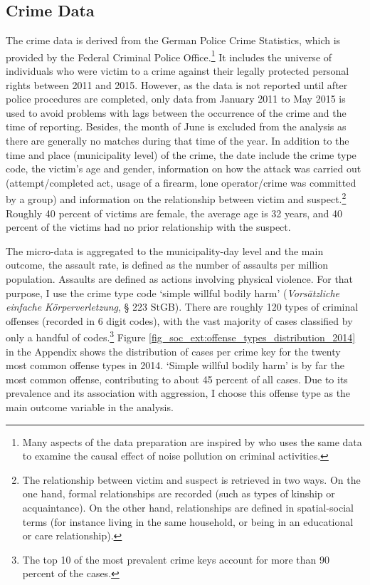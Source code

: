 \subsection{Crime Data}
The crime data is derived from the German Police Crime Statistics, which is provided by the Federal Criminal Police Office.\footnote{Many aspects of the data preparation are inspired by \cite{hener2019noise} who uses the same data to examine the causal effect of noise pollution on criminal activities.} It includes the universe of individuals who were victim to a crime against their legally protected personal rights between 2011 and 2015. However, as the data is not reported until after police procedures are completed, only data from January 2011 to May 2015 is used to avoid problems with lags between the occurrence of the crime and the time of reporting. Besides, the month of June is excluded from the analysis as there are generally no matches during that time of the year. In addition to the time and place (municipality level) of the crime, the date include the crime type code, the victim's age and gender, information on how the attack was carried out (attempt/completed act, usage of a firearm, lone operator/crime was committed by a group) and information on the relationship between victim and suspect.\footnote{The relationship between victim and suspect is retrieved in two ways. On the one hand, formal relationships are recorded (such as types of kinship or acquaintance). On the other hand, relationships are defined in spatial-social terms (for instance living in the same household, or being in an educational or care relationship).} Roughly 40 percent of victims are female, the average age is 32 years, and 40 percent of the victims had no prior relationship with the suspect.




The micro-data is aggregated to the municipality-day level and the main outcome, the assault rate, is defined as the number of assaults per million population. Assaults are defined as actions involving physical violence. For that purpose, I use the crime type code `simple willful bodily harm' (\textit{Vorsätzliche einfache Körperverletzung}, § 223 StGB). There are roughly 120 types of criminal offenses (recorded in 6 digit codes), with the vast majority of cases classified by only a handful of codes.\footnote{The top 10 of the most prevalent crime keys account for more than 90 percent of the cases.} Figure \ref{fig_soc_ext:offense_types_distribution_2014} in the Appendix shows the distribution of cases per crime key for the twenty most common offense types in 2014. `Simple willful bodily harm' is by far the most common offense, contributing to about 45 percent of all cases. Due to its prevalence and its association with aggression, I choose this offense type as the main outcome variable in the analysis.

